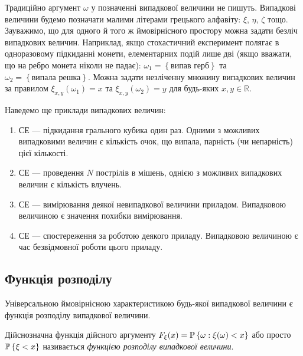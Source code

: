 Традиційно аргумент $\omega$ у позначенні випадкової величини не пишуть.
Випадкові величини будемо позначати малими літерами грецького алфавіту: $\xi$, $\eta$, $\zeta$ тощо.
Зауважимо, що для одного й того ж ймовірнісного простору можна задати безліч випадкових величин.
Наприклад, якщо стохастичний експеримент полягає в одноразовому підкиданні монети, елементарних подій лише дві
(якщо вважати, що на ребро монета ніколи не падає):
$\omega_1 = \left\{\text{випав герб}\right\}$ та $\omega_2 = \left\{\text{випала решка} \right\}$.
Можна задати незліченну множину випадкових величин за правилом $\xi_{x, y}(\omega_1) = x$ та
$\xi_{x, y}(\omega_2) = y$ для будь-яких $x, y\in\mathbb{R}$.

\begin{example}
    Наведемо ще приклади випадкових величин:
    \begin{enumerate}
        \item СЕ --- підкидання грального кубика один раз. Одними з можливих випадковими величин
        є кількість очок, що випала, парність (чи непарність) цієї кількості.
        \item СЕ --- проведення $N$ пострілів в мішень, однією з можливих випадкових величин є кількість влучень.
        \item СЕ --- вимірювання деякої невипадкової величини приладом. Випадковою величиною є значення похибки вимірювання.
        \item СЕ --- спостереження за роботою деякого приладу. Випадковою величиною є час безвідмовної роботи цього приладу.
    \end{enumerate}
\end{example}


\subsection{Функція розподілу}

Універсальною ймовірнісною характеристикою будь-якої випадкової величини є функція 
розподілу випадкової величини.

\begin{definition}
    Дійснозначна функція дійсного аргументу $ F_\xi (x) = 
    \P\left\{\omega:\xi(\omega) < x\right\}$ або просто
    $\P\left\{\xi < x\right\}$ називається \emph{функцією розподілу випадкової величини}.
\end{definition}

